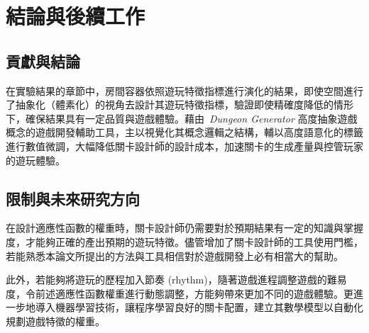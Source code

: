 \chapter{結論與後續工作}
\label{cha:conclusions}

\section{貢獻與結論}

在實驗結果的章節中，房間容器依照遊玩特徵指標進行演化的結果，即使空間進行了抽象化（體素化）的視角去設計其遊玩特徵指標，驗證即使精確度降低的情形下，確保結果具有一定品質與遊戲體驗。藉由~\textit{Dungeon Generator} 高度抽象遊戲概念的遊戲開發輔助工具，主以視覺化其概念邏輯之結構，輔以高度語意化的標籤進行數值微調，大幅降低關卡設計師的設計成本，加速關卡的生成產量與控管玩家的遊玩體驗。

\section{限制與未來研究方向} 

在設計適應性函數的權重時，關卡設計師仍需要對於預期結果有一定的知識與掌握度，才能夠正確的產出預期的遊玩特徵。儘管增加了關卡設計師的工具使用門檻，若能熟悉本論文所提出的方法與工具相信對於遊戲開發上必有相當大的幫助。

此外，若能夠將遊玩的歷程加入節奏 (rhythm)，隨著遊戲進程調整遊戲的難易度，令前述適應性函數權重進行動態調整，方能夠帶來更加不同的遊戲體驗。更進一步地導入機器學習技術，讓程序學習良好的關卡配置，建立其數學模型以自動化規劃遊戲特徵的權重。